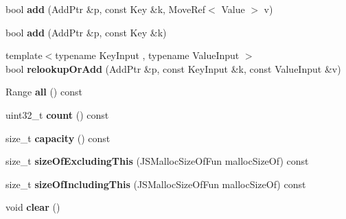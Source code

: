 \begin{DoxyCompactItemize}
\item 
\hypertarget{classjs_1_1_hash_map_a1580f81ab1dc34921d41a1b0ba8a6643}{bool {\bfseries add} (Add\-Ptr \&p, const Key \&k, Move\-Ref$<$ Value $>$ v)}\label{classjs_1_1_hash_map_a1580f81ab1dc34921d41a1b0ba8a6643}

\item 
\hypertarget{classjs_1_1_hash_map_ae34adf6637360d0c9a4f8448cca5120a}{bool {\bfseries add} (Add\-Ptr \&p, const Key \&k)}\label{classjs_1_1_hash_map_ae34adf6637360d0c9a4f8448cca5120a}

\item 
\hypertarget{classjs_1_1_hash_map_a451dd0917ff93675c8ae2fce28a8b121}{{\footnotesize template$<$typename Key\-Input , typename Value\-Input $>$ }\\bool {\bfseries relookup\-Or\-Add} (Add\-Ptr \&p, const Key\-Input \&k, const Value\-Input \&v)}\label{classjs_1_1_hash_map_a451dd0917ff93675c8ae2fce28a8b121}

\item 
\hypertarget{classjs_1_1_hash_map_a462b08d70dcc71fd2ca2a71a2c52a3c6}{Range {\bfseries all} () const }\label{classjs_1_1_hash_map_a462b08d70dcc71fd2ca2a71a2c52a3c6}

\item 
\hypertarget{classjs_1_1_hash_map_af1575eddd562fee8ca262cc4c63de7f6}{uint32\-\_\-t {\bfseries count} () const }\label{classjs_1_1_hash_map_af1575eddd562fee8ca262cc4c63de7f6}

\item 
\hypertarget{classjs_1_1_hash_map_aad1b5e2bfe1cf3eb000925a9f1cf89d0}{size\-\_\-t {\bfseries capacity} () const }\label{classjs_1_1_hash_map_aad1b5e2bfe1cf3eb000925a9f1cf89d0}

\item 
\hypertarget{classjs_1_1_hash_map_a190dc49d975aa9b7c9417c81e42ef86e}{size\-\_\-t {\bfseries size\-Of\-Excluding\-This} (J\-S\-Malloc\-Size\-Of\-Fun malloc\-Size\-Of) const }\label{classjs_1_1_hash_map_a190dc49d975aa9b7c9417c81e42ef86e}

\item 
\hypertarget{classjs_1_1_hash_map_abc8049b8510a04bb7d08a6a0110a61dc}{size\-\_\-t {\bfseries size\-Of\-Including\-This} (J\-S\-Malloc\-Size\-Of\-Fun malloc\-Size\-Of) const }\label{classjs_1_1_hash_map_abc8049b8510a04bb7d08a6a0110a61dc}

\item 
\hypertarget{classjs_1_1_hash_map_a14ca342813a52b4d1e9e49fd179418d5}{void {\bfseries clear} ()}\label{classjs_1_1_hash_map_a14ca342813a52b4d1e9e49fd179418d5}


\end{DoxyCompactItemize}
